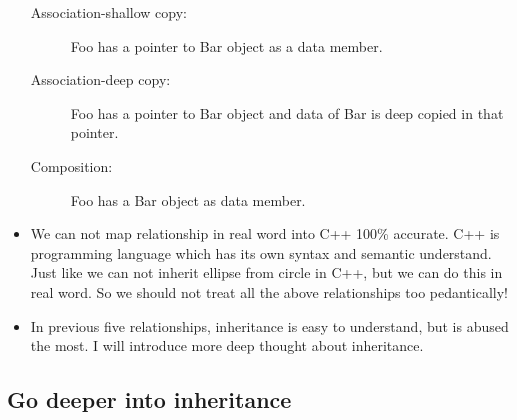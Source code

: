 \documentclass[a4paper,11pt,twoside]{book}
\begin{document}
\begin{itemize}
	\begin{description}

		\item[Association-shallow copy:] Foo has a pointer to Bar object as a data member.
		\item[Association-deep copy:] Foo has a pointer to Bar object and data of Bar is deep copied in that pointer.
		\item[Composition:] Foo has a Bar object as data member.
	\end{description}

	\item We can not map relationship in real word into C++ 100\% accurate. C++ is programming language which has its own syntax and semantic understand. Just like we can not inherit ellipse from circle in C++, but we can do this in real word. So we should not treat all the above relationships too pedantically!

    \item In previous five relationships, inheritance is easy to understand, but is abused the most. I will introduce more deep thought about inheritance. 
	
\end{itemize}

\subsection{Go deeper into inheritance}
\end{document}
